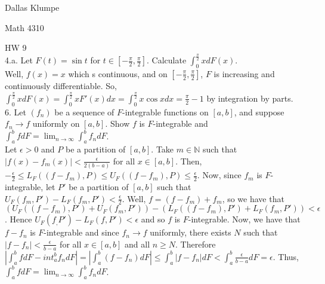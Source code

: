 \documentclass[12pt]{article}
\begin{document}
\noindent Dallas Klumpe

\noindent Math 4310

\noindent HW 9\\

4.a. Let $F(t)=\sin t$ for $t\in[-\frac{\pi}{2},\frac{\pi}{2}]$. Calculate $\int_0^{\frac{\pi}{2}}xdF(x)$.\\
Well, $f(x)=x$ which s continuous, and on $[-\frac{\pi}{2},\frac{\pi}{2}]$, $F$ is increasing and continuously differentiable. So, $\int_0^{\frac{\pi}{2}}xdF(x)=\int_0^{\frac{\pi}{2}}xF'(x)dx=\int_0^{\frac{\pi}{2}}x\cos xdx=\frac{\pi}{2}-1$ by integration by parts.\\[20pt]

6. Let $(f_n)$ be a sequence of $F$-integrable functions on $[a,b]$, and suppose $f_n\rightarrow f$ uniformly on $[a,b]$. Show $f$ is $F$-integrable and $\int_a^bfdF=\lim_{n\rightarrow\infty}\int_a^bf_ndF$.\\
Let $\epsilon>0$ and $P$ be a partition of $[a,b]$. Take $m\in\mathbb{N}$ such that $|f(x)-f_m(x)|<\frac{\epsilon}{2(b-a)}$ for all $x\in[a,b]$. Then, $-\frac{\epsilon}{2}\leq L_F((f-f_m),P)\leq U_F((f-f_m),P)\leq\frac{\epsilon}{2}$. Now, since $f_m$ is $F$-integrable, let $P'$ be a partition of $[a,b]$ such that $U_F(f_m,P')-L_F(f_m,P')<\frac{\epsilon}{2}$. Well, $f=(f-f_m)+f_m$, so we have that $(U_F((f-f_m),P')+U_F(f_m,P'))-(L_F((f-f_m),P')+L_F(f_m,P'))<\epsilon$. Hence $U_F(f_,P')-L_F(f,P')<\epsilon$ and so $f$ is $F$-integrable. Now, we have that $f-f_n$ is $F$-integrable and since $f_n\rightarrow f$ uniformly, there exists $N$ such that $|f-f_n|<\frac{\epsilon}{b-a}$ for all $x\in[a,b]$ and all $n\geq N$. Therefore $|\int_a^bfdF-int_a^bf_ndF|=|\int_a^b(f-f_n)dF|\leq\int_a^b|f-f_n|dF<\int_a^b\frac{\epsilon}{b-a}dF=\epsilon$. Thus, $\int_a^bfdF=\lim_{n\rightarrow\infty}\int_a^bf_ndF$.\\[20pt]
\end{document}
